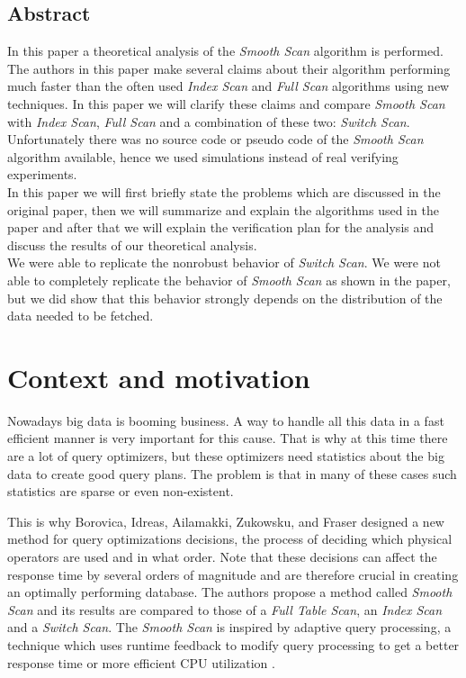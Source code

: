 \documentclass[a4paper,11pt,twoside]{article}
\begin{document}
    \newpage
\begin{center}\section*{Abstract}\end{center}
In this paper a theoretical analysis of the \textit{Smooth Scan} algorithm \cite{smoothscan} is performed. The authors in this paper make several claims about their algorithm performing much faster than the often used \textit{Index Scan} and \textit{Full Scan} algorithms using new techniques. In this paper we will clarify these claims and compare \textit{Smooth Scan} with \textit{Index Scan}, \textit{Full Scan} and a combination of these two: \textit{Switch Scan}. Unfortunately there was no source code or pseudo code of the \textit{Smooth Scan} algorithm available, hence we used simulations instead of real verifying experiments. \\
In this paper we will first briefly state the problems which are discussed in the original paper, then we will summarize and explain the algorithms used in the paper and after that we will explain the verification plan for the analysis and discuss the results of our theoretical analysis.\\
We were able to replicate the nonrobust behavior of \textit{Switch Scan}. We were not able to completely replicate the behavior of \textit{Smooth Scan} as shown in the paper, but we did show that this behavior strongly depends on the distribution of the data needed to be fetched.

\newpage
\section{Context and motivation}
Nowadays big data is booming business. A way to handle all this data in a fast efficient manner is very important for this cause. That is why at this time there are a lot of query optimizers, but these optimizers need statistics about the big data to create good query plans. The problem is that in many of these cases such statistics are sparse or even non-existent.

This is why Borovica, Idreas, Ailamakki, Zukowsku, and Fraser \cite{smoothscan} designed a new method for query optimizations decisions, the process of deciding which physical operators are used and in what order. Note that these decisions can affect the response time by several orders of magnitude and are therefore crucial in creating an optimally performing database. The authors propose a method called \emph{Smooth Scan} and its results are compared to those of a \emph{Full Table Scan}, an \emph{Index Scan} and a \emph{Switch Scan}. The \emph{Smooth Scan} is inspired by adaptive query processing, a technique which uses runtime feedback to modify query processing to get a better response time or more efficient CPU utilization \cite{query}.
\end{document}
